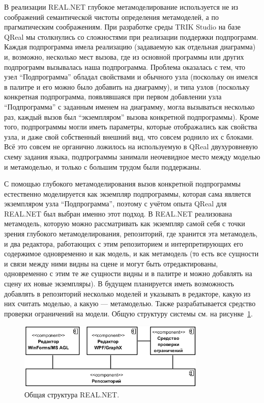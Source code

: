\documentclass{spisok-article}
\begin{document}
В реализации REAL.NET глубокое метамоделирование используется не из соображений семантической чистоты определения метамоделей, а по прагматическим соображениям. При разработке среды TRIK Studio на базе QReal мы столкнулись со сложностями при реализации поддержки подпрограмм. Каждая подпрограмма имела реализацию (задаваемую как отдельная диаграмма) и, возможно, несколько мест вызова, где из основной программы или других подпрограмм вызывалась наша подпрограмма. Проблема оказалась с тем, что узел ``Подпрограмма'' обладал свойствами и обычного узла (поскольку он имелся в палитре и его можно было добавить на диаграмму), и типа узлов (поскольку конкретная подпрограмма, появлявшаяся при первом добавлении узла ``Подпрограмма'' с заданным именем на диаграмму, могла вызываться несколько раз, каждый вызов был ``экземпляром'' вызова конкретной подпрограммы). Кроме того, подпрограммы могли иметь параметры, которые отображались как свойства узла, и даже свой собственный внешний вид, что совсем роднило их с блоками. Всё это совсем не органично ложилось на используемую в QReal двухуровневую схему задания языка, подпрограммы занимали неочевидное место между моделью и метамоделью, и только с большим трудом были поддержаны.

С помощью глубокого метамоделирования вызов конкретной подпрограммы естественно моделируется как экземпляр подпрограммы, которая сама является экземпляром узла ``Подпрограмма'', поэтому с учётом опыта QReal для REAL.NET был выбран именно этот подход. В REAL.NET реализована метамодель, которую можно рассматривать как экземпляр самой себя с точки зрения глубокого метамоделирования, репозиторий, где хранится эта метамодель, и два редактора, работающих с этим репозиторием и интерпретирующих его содержимое одновременно и как модель, и как метамодель (то есть все сущности и связи между ними видны на сцене и могут быть отредактированы, одновременно с этим те же сущности видны и в палитре и можно добавлять на сцену их новые экземпляры). В будущем планируется иметь возможность добавлять в репозиторий несколько моделей и указывать в редакторе, какую из них считать моделью, а какую --- метамоделью. Также разрабатывается средство проверки ограничений на модели. Общую структуру системы см. на рисунке~\ref{image:architecture}.

\begin{figure}[ht]
	\centering
	\includegraphics[width=0.8\textwidth]{architecture.png}
	\caption{Общая структура REAL.NET.}
	\label{image:architecture}
\end{figure}
\end{document}
